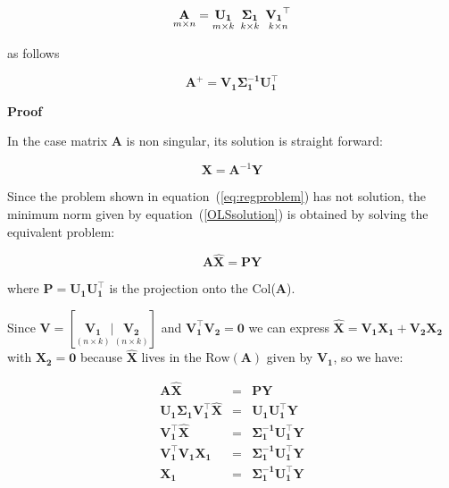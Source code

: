 \begin{equation}
    \label{eq:compactsvd}
    \underset{m \times n}{\mathbf{A}}=
    \underset{m \times k}{\mathbf{U_1}} \enskip
    \underset{k \times k}{\mathbf{\Sigma_1}} \enskip
    \underset{k \times n}{\mathbf{V_1}^\top}
\end{equation}

\noindent as follows

\begin{equation}
\label{eq:pseudoinversesvd}
\mathbf{A}^+ = \mathbf{V_1\Sigma_1^{-1}U_1^\top}
\end{equation}

\textbf{Proof}\quad

In the case matrix $\mathbf{A}$ is non singular, its solution is
straight forward:

\begin{equation}
\label{OLSsolution}
    \mathbf{\mathbf{X}}=\mathbf{A}^{-1}\mathbf{Y}
\end{equation}


Since the problem shown in equation~(\ref{eq:regproblem}) has not
solution, the minimum norm given by equation~(\ref{OLSsolution}) is
obtained by solving the equivalent problem:

\begin{equation*}
\label{eq:proyectorsol}
\mathbf{A \hat{\mathbf{X}} = PY} 
\end{equation*}


\noindent where $\mathbf{P=U_1 U_1^\top}$ is the projection onto the
Col($\mathbf{A}$). 

Since $\mathbf{V} = [\underset{(n \times k)}{\mathbf{V_1}} |
\underset{(n \times k)}{\mathbf{V_2}}]$ and $\mathbf{V_1^\top V_2 =
0}$ we can express $\mathbf{\hat{\mathbf{X}}} = \mathbf{V_1 \mathbf{X}_1 + V_2 \mathbf{X}_2}$
with $\mathbf{\mathbf{X}_2=0}$ because $\mathbf{\hat{\mathbf{X}}}$ lives in the
$\text{Row}(\mathbf{A})$ given by $\mathbf{V_1}$, so we have:

\begin{eqnarray*}
\mathbf{A \hat{\mathbf{X}}} &=& \mathbf{PY} \\
\mathbf{U_1 \Sigma_1 V_1^\top \hat{\mathbf{X}}} &=& \mathbf{U_1 U_1^\top Y} \\
\mathbf{ V_1^\top \hat{\mathbf{X}}} &=&  \mathbf{\Sigma_1^{-1} U_1^\top Y} \\ 
\mathbf{ V_1^\top V_1 \mathbf{X}_1} &=& \mathbf{\Sigma_1^{-1}
U_1^\top Y} \\
\mathbf{\mathbf{X}_1}&=& \mathbf{\Sigma_1^{-1} U_1^\top Y}
\end{eqnarray*}

